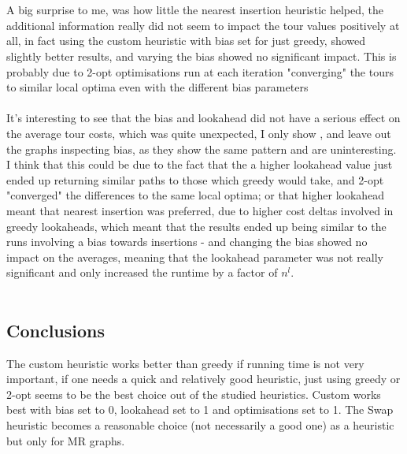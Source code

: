 \documentclass{report}
\begin{document}
\\\\
A big surprise to me, was how little the nearest insertion heuristic helped, the additional information really did not seem to impact the tour values positively at all, in fact using the custom heuristic with bias set for just greedy, showed slightly better results, and varying the bias showed no significant impact. This is probably due to 2-opt optimisations run at each iteration "converging" the tours to similar local optima even with the different bias parameters\\\\
It's interesting to see that the bias and lookahead did not have a serious effect on the average tour costs, which was quite unexpected, I only show , and leave out the graphs inspecting bias, as they show the same pattern and are uninteresting. I think that this could be due to the fact that the a higher lookahead value just ended up returning similar paths to those which greedy would take, and 2-opt "converged" the differences to the same local optima; or that higher lookahead meant that nearest insertion was preferred, due to higher cost deltas involved in greedy lookaheads, which meant that the results ended up being similar to the runs involving a bias towards insertions - and changing the bias showed no impact on the averages, meaning that the lookahead parameter was not really significant and only increased the runtime by a factor of $n^{l}$.
\\\\
\subsection{Conclusions}
The custom heuristic works better than greedy if running time is not very important, if one needs a quick and relatively good heuristic, just using greedy or 2-opt seems to be the best choice out of the studied heuristics. Custom works best with bias set to 0, lookahead set to 1 and optimisations set to 1. The Swap heuristic becomes a reasonable choice (not necessarily a good one) as a heuristic but only for MR graphs.
\end{document}
